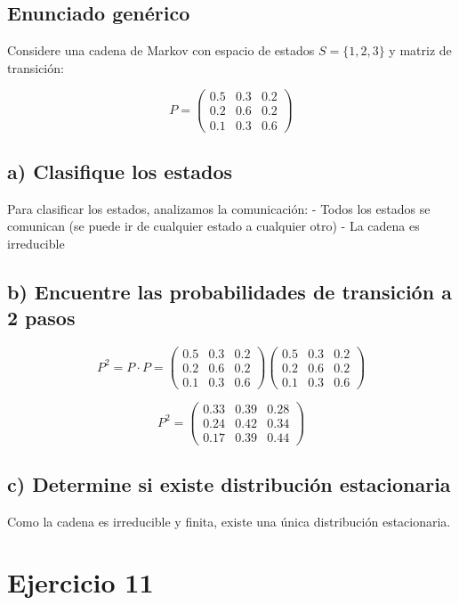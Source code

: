 \documentclass{article}
\begin{document}
\subsection*{Enunciado genérico}
Considere una cadena de Markov con espacio de estados \(S = \{1, 2, 3\}\) y matriz de transición:

\[
P = \begin{pmatrix}
0.5 & 0.3 & 0.2 \\
0.2 & 0.6 & 0.2 \\
0.1 & 0.3 & 0.6
\end{pmatrix}
\]

\subsection*{a) Clasifique los estados}

Para clasificar los estados, analizamos la comunicación:
- Todos los estados se comunican (se puede ir de cualquier estado a cualquier otro)
- La cadena es irreducible

\subsection*{b) Encuentre las probabilidades de transición a 2 pasos}

\[
P^2 = P \cdot P = \begin{pmatrix}
0.5 & 0.3 & 0.2 \\
0.2 & 0.6 & 0.2 \\
0.1 & 0.3 & 0.6
\end{pmatrix}
\begin{pmatrix}
0.5 & 0.3 & 0.2 \\
0.2 & 0.6 & 0.2 \\
0.1 & 0.3 & 0.6
\end{pmatrix}
\]

\[
P^2 = \begin{pmatrix}
0.33 & 0.39 & 0.28 \\
0.24 & 0.42 & 0.34 \\
0.17 & 0.39 & 0.44
\end{pmatrix}
\]

\subsection*{c) Determine si existe distribución estacionaria}

Como la cadena es irreducible y finita, existe una única distribución estacionaria.

\section*{Ejercicio 11}
\end{document}
